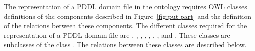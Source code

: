 The representation of a PDDL domain file in the ontology requires OWL classes 
definitions of the components described in Figure~\ref{fig:put-part} and the 
definition of the relations between these components. The different classes 
required for the representation of a PDDL domain file are , 
, , , , 
, , and . These 
classes are subclasses of the class . The relations between 
these classes are described below.

